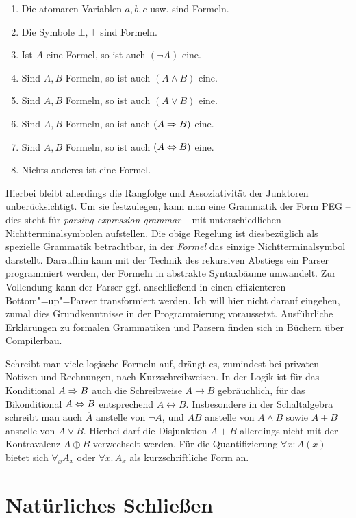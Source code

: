 \begin{enumerate}\setlength\itemsep{0em}
\item Die atomaren Variablen $a,b,c$ usw. sind Formeln.
\item Die Symbole $\bot,\top$ sind Formeln.
\item Ist $A$ eine Formel, so ist auch $(\lnot A)$ eine.
\item Sind $A,B$ Formeln, so ist auch $(A\land B)$ eine.
\item Sind $A,B$ Formeln, so ist auch $(A\lor B)$ eine.
\item Sind $A,B$ Formeln, so ist auch $(A\Rightarrow B)$ eine.
\item Sind $A,B$ Formeln, so ist auch $(A\Leftrightarrow B)$ eine.
\item Nichts anderes ist eine Formel.
\end{enumerate}

\noindent
Hierbei bleibt allerdings die Rangfolge und Assoziativität der Junktoren
unberücksichtigt. Um sie festzulegen, kann man eine Grammatik der Form PEG
-- dies steht für \emph{parsing expression grammar}
-- mit unterschiedlichen Nichtterminalsymbolen aufstellen. Die obige Regelung
ist diesbezüglich als spezielle Grammatik betrachtbar, in der \emph{Formel}
das einzige Nichtterminalsymbol darstellt. Daraufhin kann mit der Technik des
rekursiven Abstiegs ein Parser programmiert werden, der Formeln in
abstrakte Syntaxbäume umwandelt. Zur Vollendung kann der Parser ggf.
anschließend in einen effizienteren Bottom"=up"=Parser transformiert
werden. Ich will hier nicht darauf eingehen, zumal dies
Grundkenntnisse in der Programmierung voraussetzt. Ausführliche
Erklärungen zu formalen Grammatiken und Parsern finden sich in Büchern
über Compilerbau.

Schreibt man viele logische Formeln auf, drängt es, zumindest bei privaten
Notizen und Rechnungen, nach Kurzschreibweisen. In der Logik ist für das
Konditional $A\Rightarrow B$ auch die Schreibweise $A\rightarrow B$ gebräuchlich,
für das Bikonditional $A\Leftrightarrow B$ entsprechend $A\leftrightarrow B$.
Insbesondere in der Schaltalgebra schreibt man auch $\overline A$
anstelle von $\lnot A$, und $AB$ anstelle von $A\land B$ sowie $A+B$
anstelle von $A\lor B$. Hierbei darf die Disjunktion $A+B$ allerdings
nicht mit der Kontravalenz $A\oplus B$ verwechselt werden. Für die
Quantifizierung $\forall x\colon A(x)$ bietet sich $\forall_x A_x$ oder
$\forall x.\, A_x$ als kurzschriftliche Form an.

\newpage
\section{Natürliches Schließen}

